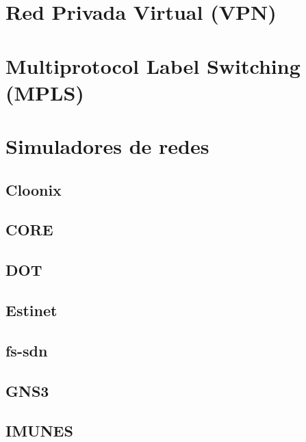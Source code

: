 



\section{Red Privada Virtual (VPN)}

\section{Multiprotocol Label Switching (MPLS)}

\section{Simuladores de redes}
\subsection{Cloonix}
\subsection{CORE}
\subsection{DOT} %
\subsection{Estinet} %
\subsection{fs-sdn} %
\subsection{GNS3}
\subsection{IMUNES}
